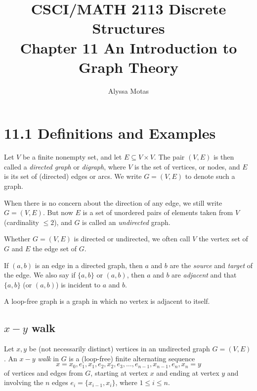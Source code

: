 \documentclass[11pt]{article}
\title{\textbf{CSCI/MATH 2113 Discrete Structures} \\ Chapter 11 An Introduction to Graph Theory}
\author{Alyssa Motas}
\begin{document}
    \maketitle

    \pagebreak

    \tableofcontents

    \pagebreak

    \section{11.1 Definitions and Examples}

    Let $V$ be a finite nonempty set, and let \(E \subseteq V \times V\). The pair \((V,E)\) is then called a \emph{directed graph} or \emph{digraph}, where $V$ is the set of vertices, or nodes, and $E$ is its set of (directed) edges or arcs. We write \(G = (V,E)\) to denote such a graph.

    \vspace{1em}

    When there is no concern about the direction of any edge, we still write \(G = (V,E)\). But now $E$ is a set of unordered pairs of elements taken from $V$ (cardinality \(\leq 2\)), and $G$ is called an \emph{undirected} graph.

    \vspace{1em}

    Whether \(G = (V,E)\) is directed or undirected, we often call $V$ the vertex set of $G$ and $E$ the edge set of $G$.

    \vspace{1em}

    If \((a,b)\) is an edge in a directed graph, then $a$ and $b$ are the \emph{source} and \emph{target} of the edge. We also say if \(\{a,b\}\) or \((a,b)\), then $a$ and $b$ are \emph{adjacent} and that \(\{a,b\}\) (or \((a,b)\)) is incident to $a$ and $b$. 

    \vspace{1em}

    A loop-free graph is a graph in which no vertex is adjacent to itself.

    \subsection{$x-y$ walk}

    Let \(x,y\) be (not necessarily distinct) vertices in an undirected graph \(G = (V,E)\). An \(x-y\) \emph{walk} in $G$ is a (loop-free) finite alternating sequence \[x = x_0, e_1, x_1, e_2, x_2, e_3, \dots, e_{n-1}, x_{n-1}, e_n, x_n = y\] of vertices and edges from $G$, starting at vertex $x$ and ending at vertex $y$ and involving the $n$ edges \(e_i = \{x_{i-1}, x_i\}\), where \(1 \leq i \leq n\). 
\end{document}
